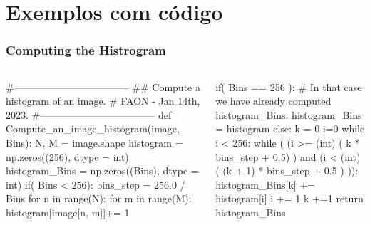 \section{Exemplos com código} %


    \begin{frame}[fragile]
    \frametitle{Computing the Histrogram}
    \begin{columns}

    \begin{roundedcodebox}
    \begin{python}
#-----------------------------------
##   Compute a histogram of an image.
#   FAON - Jan 14th, 2023.
#-----------------------------------
def Compute_an_image_histogram(image, Bins):          
    N, M = image.shape  
    histogram = np.zeros((256), dtype = int)             
    histogram_Bins = np.zeros((Bins), dtype = int)
    if( Bins < 256):
        bins_step = 256.0 / Bins        
        for n in range(N):
          for m in range(M):
            histogram[image[n, m]]+= 1   
    \end{python}
\end{roundedcodebox}
    \begin{roundedcodebox}
    \begin{python}  
      if( Bins == 256 ): # In that case we have already computed histogram_Bins.
        histogram_Bins = histogram
    else:
        k = 0
        i=0
        while i < 256: 
            while ( (i >= (int) ( k * bins_step + 0.5) ) and (i < (int) (  (k + 1) * bins_step + 0.5 ) )):
                histogram_Bins[k] += histogram[i] 
                i += 1                 
            k +=1                 
    return histogram_Bins    
      \end{python}
\end{roundedcodebox}
    \end{columns}
\end{frame}

